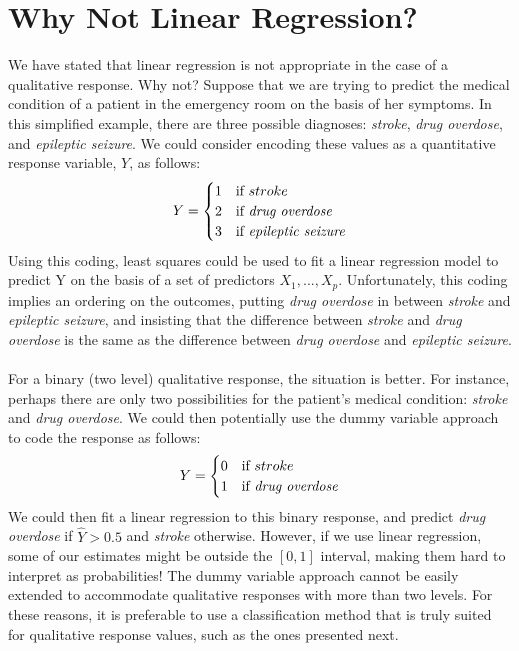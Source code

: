 \section{Why Not Linear Regression?}
\label{lin_reg}
We have stated that linear regression is not appropriate in the case of a
qualitative response. Why not? Suppose that we are trying to predict the medical condition of a patient in the emergency room on the basis of her symptoms. In this simplified example, there are three possible diagnoses: \textit{stroke}, \textit{drug overdose}, and \textit{epileptic seizure}. We could consider encoding these values as a quantitative response variable, $Y$, as follows:
\[
Y = \begin{cases}
    1 & \text{if $stroke$}\\
    2 & \text{if \textit{drug overdose}}\\
    3 & \text{if \textit{epileptic seizure}}
\end{cases}
\]
Using this coding, least squares could be used to fit a linear regression model
to predict Y on the basis of a set of predictors $X_1,...,X_p$. Unfortunately, this coding implies an ordering on the outcomes, putting \textit{drug overdose} in between \textit{stroke} and \textit{epileptic seizure}, and insisting that the difference between \textit{stroke} and \textit{drug overdose} is the same as the difference between \textit{drug overdose} and \textit{epileptic seizure}.\\\\
For a binary (two level) qualitative response, the situation is better. For
instance, perhaps there are only two possibilities for the patient’s medical condition: \textit{stroke} and \textit{drug overdose}. We could then potentially use the dummy variable approach to code the response as follows:
\[
Y = \begin{cases}
    0 & \text{if $stroke$}\\
    1 & \text{if \textit{drug overdose}}
\end{cases}
\]
We could then fit a linear regression to this binary response, and predict
\textit{drug overdose} if $\hat{Y} > 0.5$ and \textit{stroke} otherwise. However, if we use linear regression, some of our estimates might be outside the $[0, 1]$ interval, making them hard to interpret as probabilities! The dummy variable approach cannot be easily extended to accommodate qualitative responses with more than two levels. For these
reasons, it is preferable to use a classification method that is truly suited for qualitative response values, such as the ones presented next.


